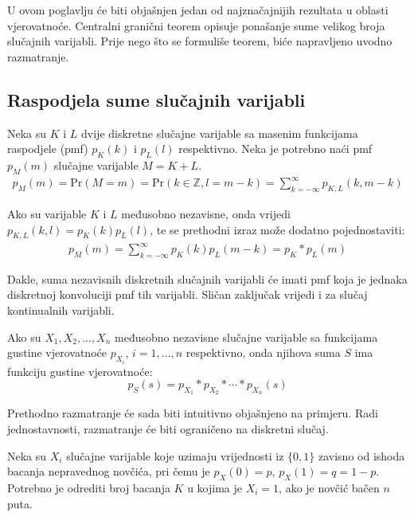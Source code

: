 U ovom poglavlju će biti objašnjen jedan od najznačajnijih rezultata u oblasti
vjerovatnoće. Centralni granični teorem opisuje ponašanje sume velikog broja
slučajnih varijabli. Prije nego što se formuliše teorem, biće napravljeno uvodno
razmatranje.

\subsection{Raspodjela sume slučajnih varijabli}

Neka su $K$ i $L$ dvije diskretne slučajne varijable sa masenim funkcijama
raspodjele (pmf) $p_K(k)$ i $p_L(l)$ respektivno. Neka je potrebno naći pmf
$p_M(m)$ slučajne varijable $M=K+L$.
%
\newcommand{\pr}{\text{Pr}}
\begin{align*}
  p_M(m) = \pr(M=m) = \pr(k\in\mathbb{Z}, l=m-k)
  = \sum_{k=-\infty}^{\infty} p_{K,L}(k,m-k)
\end{align*}

Ako su varijable $K$ i $L$ međusobno nezavisne, onda vrijedi $p_{K,L}(k,l) =
p_K(k)p_L(l)$, te se prethodni izraz može dodatno pojednostaviti:
%
\begin{align*}
  p_M(m) = \sum_{k=-\infty}^{\infty} p_K(k)p_L(m-k) = p_K * p_L (m)
\end{align*}

Dakle, suma nezavisnih diskretnih slučajnih varijabli će imati pmf koja je
jednaka diskretnoj konvoluciji pmf tih varijabli. Sličan zaključak vrijedi i za
slučaj kontinualnih varijabli.

\begin{theorem} %

  Ako su $X_1,X_2,...,X_n$ međusobno nezavisne slučajne varijable sa funkcijama
  gustine vjerovatnoće $p_{X_i}$, $i=1,...,n$ respektivno, onda njihova suma $S$
  ima funkciju gustine vjerovatnoće:
  $$p_S(s) = p_{X_1} * p_{X_2} * \cdots * p_{X_n} (s)$$

\end{theorem}

Prethodno razmatranje će sada biti intuitivno objašnjeno na primjeru.  Radi
jednostavnosti, razmatranje će biti ograničeno na diskretni slučaj.

\begin{exmp} \label{ex:novcic}
  
Neka su $X_i$ slučajne varijable koje uzimaju vrijednosti iz $\{0,1\}$ zavisno
od ishoda bacanja nepravednog novčića, pri čemu je $p_X(0)= p$, $p_X(1)=q=1-p$.
Potrebno je odrediti broj bacanja $K$ u kojima je $X_i=1$, ako je novčić bačen
$n$ puta.

\end{exmp}

